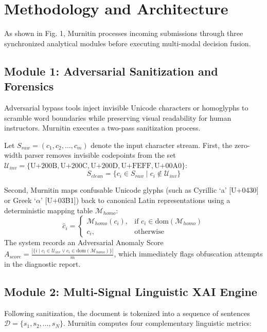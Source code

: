 \documentclass[conference]{IEEEtran}
\begin{document}
\section{Methodology and Architecture}

As shown in Fig. 1, Murnitin processes incoming submissions through three synchronized analytical modules before executing multi-modal decision fusion.

\subsection{Module 1: Adversarial Sanitization and Forensics}
Adversarial bypass tools inject invisible Unicode characters or homoglyphs to scramble word boundaries while preserving visual readability for human instructors. Murnitin executes a two-pass sanitization process.

Let $S_{raw} = (c_1, c_2, \dots, c_m)$ denote the input character stream. First, the zero-width parser removes invisible codepoints from the set $\mathcal{U}_{inv} = \{\text{U+200B}, \text{U+200C}, \text{U+200D}, \text{U+FEFF}, \text{U+00A0}\}$:
\begin{equation}
S_{clean} = \{c_i \in S_{raw} \mid c_i \notin \mathcal{U}_{inv}\}
\label{eq_clean}
\end{equation}

Second, Murnitin maps confusable Unicode glyphs (such as Cyrillic `a' [U+0430] or Greek `$\alpha$' [U+03B1]) back to canonical Latin representations using a deterministic mapping table $\mathcal{M}_{homo}$:
\begin{equation}
\hat{c}_i = 
\begin{cases} 
\mathcal{M}_{homo}(c_i), & \text{if } c_i \in \text{dom}(\mathcal{M}_{homo}) \\
c_i, & \text{otherwise}
\end{cases}
\label{eq_homo}
\end{equation}
The system records an Adversarial Anomaly Score $A_{score} = \frac{|\{i \mid c_i \in \mathcal{U}_{inv} \lor c_i \in \text{dom}(\mathcal{M}_{homo})\}|}{m}$, which immediately flags obfuscation attempts in the diagnostic report.

\subsection{Module 2: Multi-Signal Linguistic XAI Engine}
Following sanitization, the document is tokenized into a sequence of sentences $\mathcal{D} = \{s_1, s_2, \dots, s_N\}$. Murnitin computes four complementary linguistic metrics:
\end{document}
